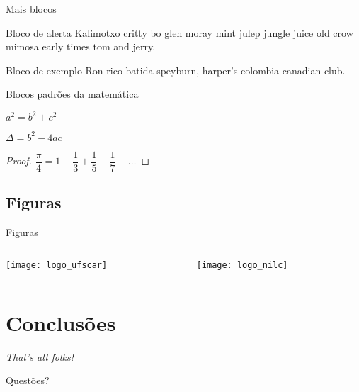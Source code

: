 \documentclass[
	brazilian, %
	12pt, %
	aspectratio = 169, %
]{beamer}
\begin{document}
\begin{frame}{Mais blocos}
	\begin{alertblock}{Bloco de alerta}
		Kalimotxo critty bo glen moray mint julep jungle juice old crow mimosa early times tom and jerry. 
	\end{alertblock}
		
	\begin{exampleblock}{Bloco de exemplo}
		Ron rico batida speyburn, harper's colombia canadian club.
	\end{exampleblock}
\end{frame}

\begin{frame}{Blocos padrões da matemática}
	\begin{theorem}
		$ a^2 = b^2 + c^2 $
	\end{theorem}
	
	\begin{corollary}
		$\Delta = b^2 - 4ac$
	\end{corollary}
	
	\begin{proof}
		$\dfrac{\pi}{4} = 1 - \dfrac{1}{3} + \dfrac{1}{5} - \dfrac{1}{7} -\ldots$
	\end{proof}
\end{frame}

\subsection{Figuras}

\begin{frame}{Figuras}
	\begin{columns}
		\begin{column}{0.5\linewidth}
			\texttt{[image: logo\_ufscar]}
		\end{column}
		\begin{column}{0.5\linewidth}
			\texttt{[image: logo\_nilc]}
		\end{column}
	\end{columns}
\end{frame}

\section{Conclusões}
\begin{frame}
	\centering
	\textit{That's all folks!}
	
	\pause
	\alert{Questões?}
\end{frame}
\end{document}
